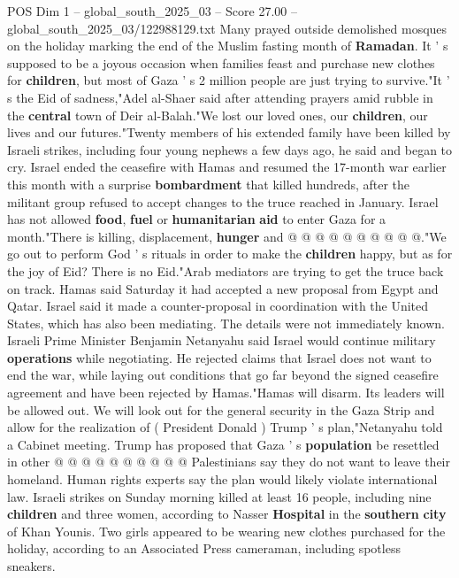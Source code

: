 \begin{textsample}{POS Dim 1 – global\_south\_2025\_03 – Score 27.00 – global\_south\_2025\_03/122988129.txt}  \label{ex:f1_pos_268}
Many prayed outside demolished mosques on the holiday marking the end of the Muslim fasting month of \textbf{Ramadan}.
It ' s supposed to be a joyous occasion when families feast and purchase new clothes for \textbf{children}, but most of Gaza ' s 2 million people are just trying to survive."It ' s the Eid of sadness,"Adel al-Shaer said after attending prayers amid rubble in the \textbf{central} town of Deir al-Balah."We lost our loved ones, our \textbf{children}, our lives and our futures."Twenty members of his extended family have been killed by Israeli strikes, including four young nephews a few days ago, he said and began to cry.
Israel ended the ceasefire with Hamas and resumed the 17-month war earlier this month with a surprise \textbf{bombardment} that killed hundreds, after the militant group refused to accept changes to the truce reached in January.
Israel has not allowed \textbf{food}, \textbf{fuel} or \textbf{humanitarian} \textbf{aid} to enter Gaza for a month."There is killing, displacement, \textbf{hunger} and @ @ @ @ @ @ @ @ @ @."We go out to perform God ' s rituals in order to make the \textbf{children} happy, but as for the joy of Eid?
There is no Eid."Arab mediators are trying to get the truce back on track.
Hamas said Saturday it had accepted a new proposal from Egypt and Qatar.
Israel said it made a counter-proposal in coordination with the United States, which has also been mediating.
The details were not immediately known.
Israeli Prime Minister Benjamin Netanyahu said Israel would continue military \textbf{operations} while negotiating.
He rejected claims that Israel does not want to end the war, while laying out conditions that go far beyond the signed ceasefire agreement and have been rejected by Hamas."Hamas will disarm.
Its leaders will be allowed out.
We will look out for the general security in the Gaza Strip and allow for the realization of ( President Donald ) Trump ' s plan,"Netanyahu told a Cabinet meeting.
Trump has proposed that Gaza ' s \textbf{population} be resettled in other @ @ @ @ @ @ @ @ @ @ Palestinians say they do not want to leave their homeland.
Human rights experts say the plan would likely violate international law.
Israeli strikes on Sunday morning killed at least 16 people, including nine \textbf{children} and three women, according to Nasser \textbf{Hospital} in the \textbf{southern} \textbf{city} of Khan Younis.
Two girls appeared to be wearing new clothes purchased for the holiday, according to an Associated Press cameraman, including spotless sneakers.

\end{textsample}
